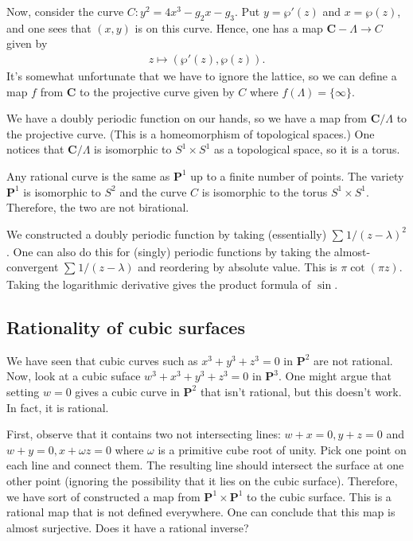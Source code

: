\documentclass[11pt, oneside,margin=1in]{article}
\begin{document}
Now, consider the curve $C:y^2 = 4x^3 - g_2x-g_3$. Put $y=\wp'(z)$ and $x=\wp(z)$, and one sees that $(x,y)$ is on this curve. Hence, one has a map $\mathbf{C}-\Lambda \longrightarrow C$ given by
\begin{align*}
	z\longmapsto (\wp'(z),\wp (z)).
\end{align*}
It's somewhat unfortunate that we have to ignore the lattice, so we can define a map $f$ from $\mathbf{C}$ to the projective curve given by $C$ where $f(\Lambda) = \{\infty\}$. 

We have a doubly periodic function on our hands, so we have a map from $\mathbf{C}/\Lambda$ to the projective curve. (This is a homeomorphism of topological spaces.) One notices that $\mathbf{C}/\Lambda$ is isomorphic to $S^1\times S^1$ as a topological space, so it is a torus.

Any rational curve is the same as $\mathbf{P}^1$ up to a finite number of points. The variety $\mathbf{P}^1$ is isomorphic to $S^2$ and the curve $C$ is isomorphic to the torus $S^1\times S^1$. Therefore, the two are not birational.

\begin{remark}
	We constructed a doubly periodic function by taking (essentially) $\sum_{}^{} 1/(z-\lambda)^2 $. One can also do this for (singly) periodic functions by taking the almost-convergent $\sum_{}^{} 1/(z-\lambda)$ and reordering by absolute value. This is $\pi\cot (\pi z)$. Taking the logarithmic derivative gives the product formula of $\sin$.
\end{remark}
\subsection{Rationality of cubic surfaces}

We have seen that cubic curves such as $x^3+y^3+z^3=0$ in $\mathbf{P}^2$ are not rational. Now, look at a cubic suface $w^3+x^3+y^3+z^3= 0$ in $\mathbf{P}^3$. One might argue that setting $w=0$ gives a cubic curve in $\mathbf{P}^2$ that isn't rational, but this doesn't work. In fact, it is rational.

First, observe that it contains two not intersecting lines: $w+x=0, y+z=0$ and $w+y=0, x+\omega z=0$ where $\omega$ is a primitive cube root of unity. Pick one point on each line and connect them. The resulting line should intersect the surface at one other point (ignoring the possibility that it lies on the cubic surface). Therefore, we have sort of constructed a map from $\mathbf{P}^1\times \mathbf{P}^1$ to the cubic surface. This is a rational map that is not defined everywhere. One can conclude that this map is almost surjective. Does it have a rational inverse?
\end{document}
